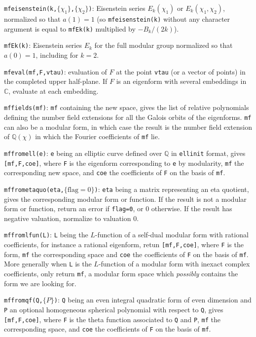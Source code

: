 \documentclass[11pt]{article}
\newcommand{\Q}{{\mathbb Q}}
\newcommand{\C}{{\mathbb C}}
\def\kbd#1{{\tt #1}}
\begin{document}
\f\kbd{mfeisenstein(k,$\{\chi_1\}$,$\{\chi_2\}$)}: Eisenstein series
$E_k(\chi_1)$ or
$E_k(\chi_1,\chi_2)$, normalized so that $a(1)=1$ (so \kbd{mfeisenstein(k)}
without any character argument is equal to \kbd{mfEk(k)} multiplied by
$-B_k/(2k)$).

\f\kbd{mfEk(k)}: Eisenstein series $E_k$ for the full modular group normalized
so that $a(0)=1$, including for $k=2$.

\f\kbd{mfeval(mf,F,vtau)}: evaluation of $F$ at the point \kbd{vtau} (or a
vector of points) in the completed upper half-plane. If $F$ is an eigenform
with several embeddings in $\C$, evaluate at each embedding.

\f\kbd{mffields(mf)}: \kbd{mf} containing the new space, gives the list of
relative polynomials defining the number field extensions for all the Galois
orbits of the eigenforms. \kbd{mf} can also be a modular form, in which case
the result is the number field extension of $\Q(\chi)$ in which the Fourier
coefficients of \kbd{mf} lie.

\f\kbd{mffromell(e)}: \kbd{e} being an elliptic curve defined over $\Q$ in
\kbd{ellinit} format, gives \kbd{[mf,F,coe]}, where \kbd{F} is the eigenform
corresponding to \kbd{e} by modularity, \kbd{mf} the corresponding new space,
and \kbd{coe} the coefficients of \kbd{F} on the basis of \kbd{mf}.

\f\kbd{mffrometaquo(eta,$\{\text{flag}=0\}$)}: \kbd{eta} being a matrix
representing an eta quotient, gives the corresponding modular form or
function. If the result is not a modular form or function, return an error if
\kbd{flag=0}, or $0$ otherwise. If the result has negative valuation,
normalize to valuation $0$.

\f\kbd{mffromlfun(L)}: \kbd{L} being the $L$-function of a self-dual
modular form with rational coefficients, for instance a rational eigenform,
retun \kbd{[mf,F,coe]}, where \kbd{F} is the form, \kbd{mf} the corresponding
space and \kbd{coe} the coefficients of \kbd{F} on the basis of \kbd{mf}.
More generally when \kbd{L} is the $L$-function of a modular form with
inexact complex coefficients, only return \kbd{mf}, a modular form space
which \emph{possibly} contains the form we are looking for.

\f\kbd{mffromqf(Q,$\{P\}$)}: \kbd{Q} being an even integral quadratic form of
even dimension and \kbd{P} an optional homogeneous spherical polynomial with
respect to \kbd{Q}, gives \kbd{[mf,F,coe]}, where \kbd{F} is the theta
function associated to \kbd{Q} and \kbd{P}, \kbd{mf} the corresponding space,
and \kbd{coe} the coefficients of \kbd{F} on the basis of \kbd{mf}.
\end{document}
